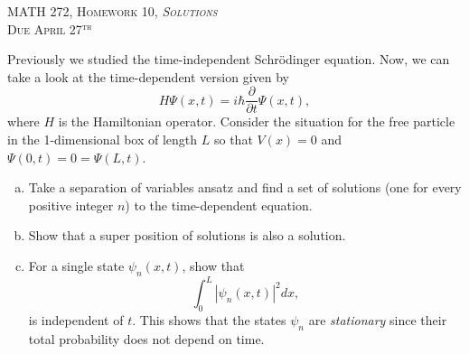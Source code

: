 \documentclass[12pt]{article} %
\begin{document}
\begin{center}
   \textsc{\large MATH 272, Homework 10, \emph{Solutions}}\\
   \textsc{Due April 27$^\textrm{th}$}
\end{center}
\vspace{.5cm}



\newpage
\begin{problem}
Previously we studied the time-independent Schr\"odinger equation. Now, we can take a look at the time-dependent version given by
\[
H \Psi(x,t) = i\hbar \frac{\partial}{\partial t} \Psi(x,t),
\]
where $H$ is the Hamiltonian operator.  Consider the situation for the free particle in the 1-dimensional box of length $L$ so that $V(x)=0$ and $\Psi(0,t)=0=\Psi(L,t)$.  
\begin{enumerate}[(a)]
    \item Take a separation of variables ansatz and find a set of solutions (one for every positive integer $n$) to the time-dependent equation.
    \item Show that a super position of solutions is also a solution.
    \item For a single state $\psi_n(x,t)$, show that 
    \[
    \int_0^L \left|\psi_n(x,t)\right|^2 dx,
    \]
    is independent of $t$. This shows that the states $\psi_n$ are \emph{stationary} since their total probability does not depend on time.
\end{enumerate}
\end{problem}
\end{document}
